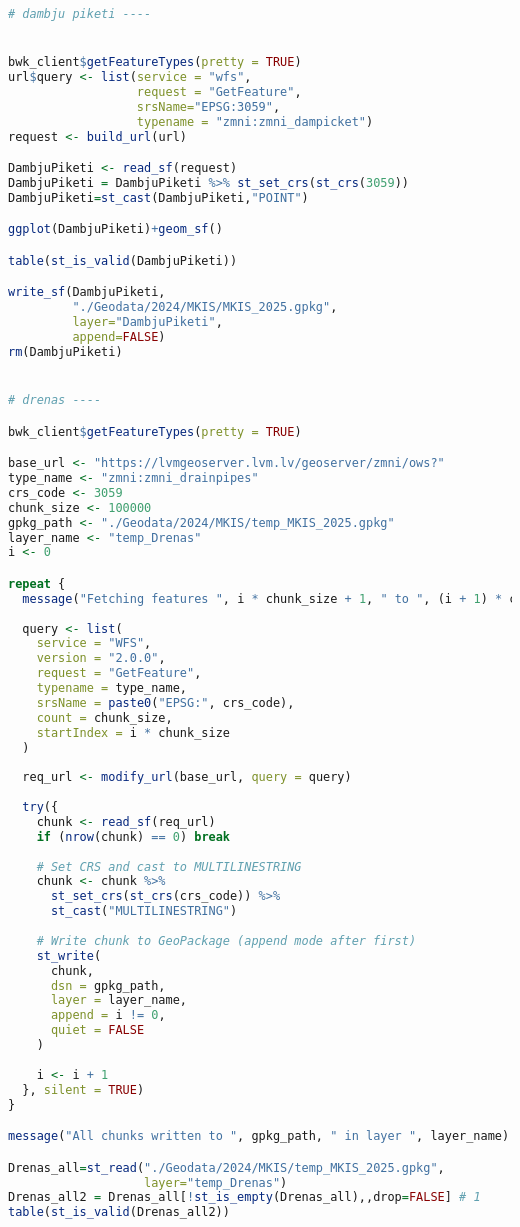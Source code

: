 \documentclass[
]{book}
\begin{document}
\begin{lstlisting}[language=R]
# dambju piketi ----


bwk_client$getFeatureTypes(pretty = TRUE)
url$query <- list(service = "wfs",
                  request = "GetFeature",
                  srsName="EPSG:3059",
                  typename = "zmni:zmni_dampicket")
request <- build_url(url)

DambjuPiketi <- read_sf(request)
DambjuPiketi = DambjuPiketi %>% st_set_crs(st_crs(3059))
DambjuPiketi=st_cast(DambjuPiketi,"POINT")

ggplot(DambjuPiketi)+geom_sf()

table(st_is_valid(DambjuPiketi))

write_sf(DambjuPiketi,
         "./Geodata/2024/MKIS/MKIS_2025.gpkg",
         layer="DambjuPiketi",
         append=FALSE)
rm(DambjuPiketi)


# drenas ----

bwk_client$getFeatureTypes(pretty = TRUE)

base_url <- "https://lvmgeoserver.lvm.lv/geoserver/zmni/ows?"
type_name <- "zmni:zmni_drainpipes"
crs_code <- 3059
chunk_size <- 100000
gpkg_path <- "./Geodata/2024/MKIS/temp_MKIS_2025.gpkg"
layer_name <- "temp_Drenas"
i <- 0

repeat {
  message("Fetching features ", i * chunk_size + 1, " to ", (i + 1) * chunk_size, "...")
  
  query <- list(
    service = "WFS",
    version = "2.0.0",
    request = "GetFeature",
    typename = type_name,
    srsName = paste0("EPSG:", crs_code),
    count = chunk_size,
    startIndex = i * chunk_size
  )
  
  req_url <- modify_url(base_url, query = query)
  
  try({
    chunk <- read_sf(req_url)
    if (nrow(chunk) == 0) break
    
    # Set CRS and cast to MULTILINESTRING
    chunk <- chunk %>%
      st_set_crs(st_crs(crs_code)) %>%
      st_cast("MULTILINESTRING")
    
    # Write chunk to GeoPackage (append mode after first)
    st_write(
      chunk, 
      dsn = gpkg_path,
      layer = layer_name,
      append = i != 0,
      quiet = FALSE
    )
    
    i <- i + 1
  }, silent = TRUE)
}

message("All chunks written to ", gpkg_path, " in layer ", layer_name)

Drenas_all=st_read("./Geodata/2024/MKIS/temp_MKIS_2025.gpkg",
                   layer="temp_Drenas")
Drenas_all2 = Drenas_all[!st_is_empty(Drenas_all),,drop=FALSE] # 1
table(st_is_valid(Drenas_all2))



\end{lstlisting}
\end{document}
